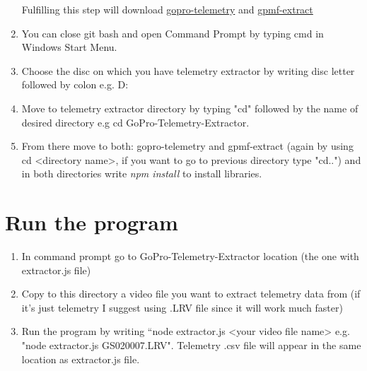 \documentclass[a4paper,12pt]{book}
\begin{document}
\begin{enumerate}
	Fulfilling this step will download \href{https://github.com/JuanIrache/gopro-telemetry}{gopro-telemetry} and \href{https://github.com/JuanIrache/gpmf-extract}{gpmf-extract}
	\item You can close git bash and open Command Prompt by typing cmd in Windows Start Menu.
	\item Choose the disc on which you have telemetry extractor by writing disc letter followed by colon e.g. D:
	\item Move to telemetry extractor directory by typing "cd" followed by the name of desired directory e.g cd GoPro-Telemetry-Extractor.
	\item From there move to both: gopro-telemetry and gpmf-extract (again by using cd <directory name>, if you want to go to previous directory type "cd..") and in both directories write \textit{npm install} to install libraries.
\end{enumerate}

\section{Run the program}
\begin{enumerate}
	\item In command prompt go to GoPro-Telemetry-Extractor location (the one with extractor.js file) 
	\item Copy to this directory a video file you want to extract telemetry data from (if it's just telemetry I suggest using .LRV file since it will work much faster)
	\item Run the program by writing “node extractor.js <your video file name> e.g. "node extractor.js GS020007.LRV". Telemetry .csv file will appear in the same location as extractor.js file.
\end{enumerate}
 
\end{document}
